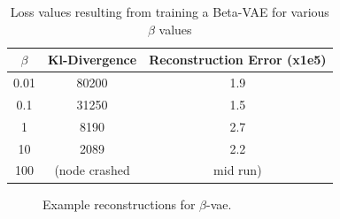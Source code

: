 \begin{table}[!ht]
    \centering
    \caption{Loss values resulting from training a Beta-VAE for various $\beta$ values}
    \label{tab:beta-vae-loss-values}
    \begin{tabular}{ccc}
        \hline
        $\beta$ & Kl-Divergence & Reconstruction Error (x1e5) \\
        \hline
        0.01    & 80200         & 1.9                         \\
        0.1     & 31250         & 1.5                         \\
        1       & 8190          & 2.7                         \\
        10      & 2089          & 2.2                         \\
        100     & (node crashed & mid run)                    \\
        \hline
    \end{tabular}
\end{table}

\begin{figure}[!ht]
    \centering
    \caption{Example reconstructions for $\beta$-vae.}
    \label{fig:beta-vae-recon-examples}
     \quad
\end{figure}


